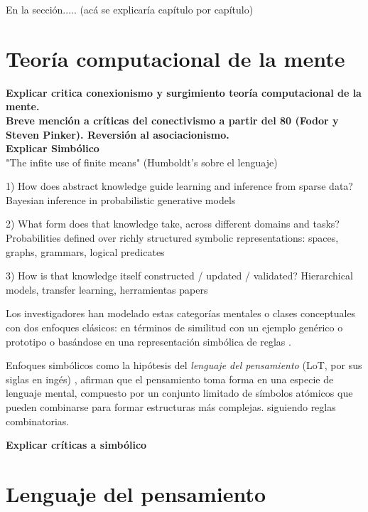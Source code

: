 En la sección..... (acá se explicaría capítulo por capítulo)


\section{Teoría computacional de la mente}
\textbf{Explicar critica conexionismo y surgimiento teoría computacional de la mente.} \\
\textbf{Breve mención a críticas del conectivismo a partir del 80 (Fodor y Steven Pinker). Reversión al asociacionismo.}\\
\textbf{Explicar Simbólico}\\

"The infite use of finite means" (Humboldt's sobre el lenguaje)

1) How does abstract knowledge guide learning and inference from sparse data?
Bayesian inference in probabilistic generative models

2) What form does that knowledge take, across different domains and tasks?
Probabilities defined over richly structured symbolic representations: spaces, graphs, grammars, logical predicates

3) How is that knowledge itself constructed / updated / validated?
Hierarchical models, transfer learning, herramientas papers


Los investigadores han modelado estas categorías mentales o clases conceptuales con dos enfoques clásicos: en términos de similitud con un ejemplo genérico o prototipo \cite{rosch1999principles, nosofsky1986attention, rosch1976structural, rosch1975family} o basándose en una representación simbólica de reglas \cite{boole1854investigation, fodor1975language, gentner1983structure}.

Enfoques simbólicos como la hipótesis del \textit{lenguaje del pensamiento} (LoT, por sus siglas en ingés) \cite{fodor1975language}, afirman que el pensamiento toma forma en una especie de lenguaje mental, compuesto por un conjunto limitado de símbolos atómicos que pueden combinarse para formar estructuras más complejas. siguiendo reglas combinatorias.

\textbf{Explicar críticas a simbólico} \cite{blackburn1984spreading, loewer1991meaning, knowles1998language, aydede1997language} \\


\section{Lenguaje del pensamiento}

